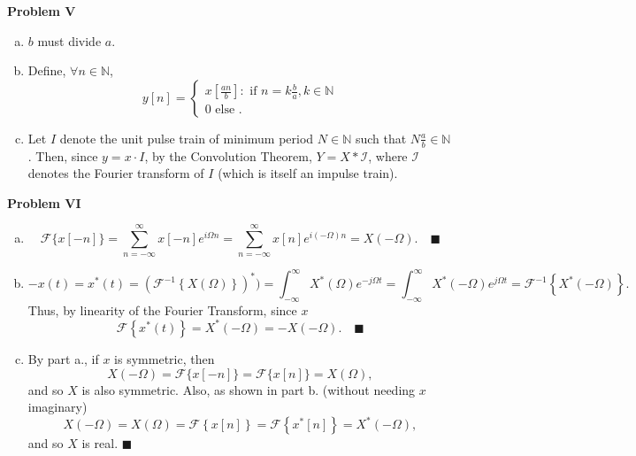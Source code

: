 \documentclass[11pt]{article}
\renewcommand{\qed}{\quad $\blacksquare$}
\newcommand{\mqed}{\quad \blacksquare}
\newcommand{\inv}{^{-1}}
\newcommand{\N}{\mathbb{N}} %
\newcommand{\F}{\mathcal{F}} %
\begin{document}
{\bf Problem V}
\begin{enumerate}[a.]
\item $b$ must divide $a$.

\item Define, $\forall n \in \N$,
\[y[n] = \left\{
\begin{array}{cl}
    x\left[ \frac{an}{b} \right]    : \mbox{ if } n = k\frac{b}{a}, k \in \N \\
    0                                 \mbox{ else }.
\end{array}
\right.
\]

\item Let $I$ denote the unit pulse train of minimum period $N \in \N$ such
that $N\frac{a}{b} \in \N$. Then, since $y = x \cdot I$, by the Convolution
Theorem, $Y = X * \mathcal{I}$, where $\mathcal{I}$ denotes the Fourier
transform of $I$ (which is itself an impulse train).
\end{enumerate}


{\bf Problem VI}
\begin{enumerate}[a.]
\item 
\[\F\{x[-n]\}
    = \sum_{n = -\infty}^\infty x[-n] e^{i\Omega n}
    = \sum_{n = -\infty}^\infty x[n] e^{i(-\Omega) n}
    = X(-\Omega). \mqed
\]
\item
\[ -x(t)
    = x^*(t)
    = \left( \F\inv \left\{ X(\Omega) \right\} \right)^*)
    = \int_{-\infty}^\infty X^*(\Omega) e^{-j\Omega t}
    = \int_{-\infty}^\infty X^*(-\Omega) e^{j\Omega t}
    = \F\inv \left\{ X^*(-\Omega) \right\}.
\]
Thus, by linearity of the Fourier Transform, since $x$ 
\[\F\left\{ x^*(t) \right\} = X^*(-\Omega) = -X(-\Omega). \mqed\]
\item By part a., if $x$ is symmetric, then
\[X(-\Omega)
    = \F\{x[-n]\}
    = \F\{x[n]\}
    = X(\Omega),
\]
and so $X$ is also symmetric. Also, as shown in part b. (without needing
$x$ imaginary)
\[X(-\Omega)
    = X(\Omega)
    = \F\left\{ x[n] \right\}
    = \F\left\{ x^*[n] \right\}
    = X^*(-\Omega),
\]
and so $X$ is real. \qed
\end{enumerate}
\end{document}
